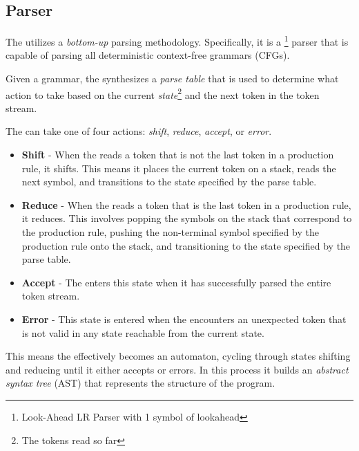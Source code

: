 \subsection{Parser}

The \lang{} \parser{} utilizes a \textit{bottom-up} parsing methodology.
Specifically, it is a \parserType{}\footnote{Look-Ahead LR Parser with 1 symbol of
lookahead} parser that is capable of parsing all deterministic context-free
grammars (CFGs).

Given a grammar, the \parser{} synthesizes a \textit{parse table} that is used to
determine what action to take based on the current \textit{state}\footnote{The tokens
read so far} and the next token in the token stream. 

The \parser{} can take one of four actions: \textit{shift}, \textit{reduce},
\textit{accept}, or \textit{error}. 

\begin{itemize} 
  
  \item \textbf{Shift} - When the \parser{} reads a token that is not the last token
    in a production rule, it shifts. This means it places the current token on a
    stack, reads the next symbol, and transitions to the state specified by the parse
    table.

  \item \textbf{Reduce} - When the \parser{} reads a token that is the last token in
    a production rule, it reduces. This involves popping the symbols on the stack
    that correspond to the production rule, pushing the non-terminal symbol specified
    by the production rule onto the stack, and transitioning to the state specified
    by the parse table.

  \item \textbf{Accept} - The \parser{} enters this state when it has successfully
    parsed the entire token stream.

  \item \textbf{Error} - This state is entered when the \parser{} encounters an
    unexpected token that is not valid in any state reachable from the current state.

\end{itemize}

This means the \parser{} effectively becomes an automaton, cycling through states
shifting and reducing until it either accepts or errors. In this process it builds an
\textit{abstract syntax tree} (AST) that represents the structure of the program.

